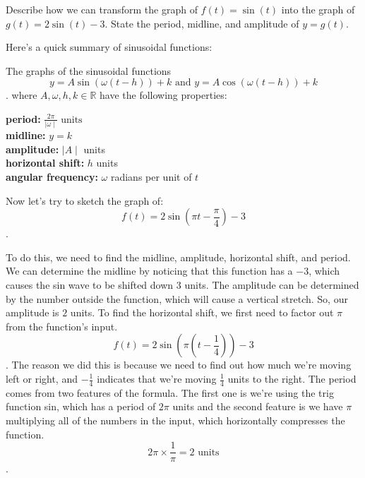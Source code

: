 
\begin{exc}
  \label{exc:transform_the_graph_of_f_to_g}

  Describe how we can transform the graph of $f(t) = \sin(t)$ into the graph of
  $g(t) = 2\sin(t) - 3$. State the period, midline, and amplitude of $y = g(t)$.
\end{exc}

Here's a quick summary of sinusoidal functions:

\begin{tcolorbox}
  The graphs of the sinusoidal functions
  \[
  y = A\sin(\omega(t - h)) + k \textrm{ and } y = A\cos(\omega(t - h)) + k
  \].
  where $A, \omega, h, k \in \mathbb{R}$ have the following properties:
  \begin{center}
    \textbf{period:} $\frac{2\pi}{\mid \omega \mid} \textrm{ units}$ \\
    \textbf{midline:} $y = k$ \\
    \textbf{amplitude:} $\mid A \mid$ units \\
    \textbf{horizontal shift:} $h$ units \\
    \textbf{angular frequency:} $\omega$ radians per unit of $t$
  \end{center}
\end{tcolorbox}

Now let's try to sketch the graph of:
\[
f(t) = 2\sin \left(\pi t - \frac{\pi}{4}\right) - 3
\].

To do this, we need to find the midline, amplitude, horizontal shift, and
period. We can determine the midline by noticing that this function has a $-3$,
which causes the sin wave to be shifted down $3$ units.
The amplitude can be determined by the number outside the function, which will
cause a vertical stretch. So, our amplitude is $2$ units. To find the horizontal
shift, we first need to factor out $\pi$ from the function's input.
\[
f(t) = 2\sin \left(\pi \left(t - \frac{1}{4}\right)\right) - 3
\].
The reason we did this is because we need to find out how much we're moving left
or right, and $-\frac{1}{4}$ indicates that we're moving $\frac{1}{4}$ units to
the right.
The period comes from two features of the formula. The first one is we're using
the trig function sin, which has a period of $2\pi$ units and the second feature
is we have $\pi$ multiplying all of the numbers in the input, which horizontally
compresses the function.
\[
2\pi \times \frac{1}{\pi} = 2 \textrm{ units}
\].

